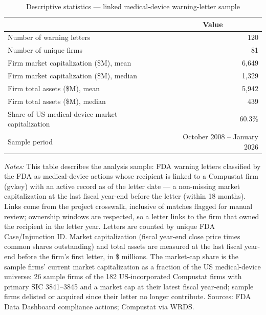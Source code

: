 \documentclass[11pt]{article}
\begin{document}
\begin{table}[h!]
\centering
\caption{Descriptive statistics --- linked medical-device warning-letter sample}
\begin{tabular}{lr}
\toprule
 & \multicolumn{1}{c}{Value} \\
\midrule
Number of warning letters & 120 \\
Number of unique firms & 81 \\
Firm market capitalization (\$M), mean & 6,649 \\
Firm market capitalization (\$M), median & 1,329 \\
Firm total assets (\$M), mean & 5,942 \\
Firm total assets (\$M), median & 439 \\
Share of US medical-device market capitalization & 60.3\% \\
Sample period & October 2008 -- January 2026 \\
\bottomrule
\end{tabular}

\vspace{1em}
\begin{minipage}{0.92\textwidth}
\footnotesize
\emph{Notes:} This table describes the analysis sample: FDA warning letters classified by the FDA as medical-device actions whose recipient is linked to a Compustat firm (gvkey) with an active record as of the letter date — a non-missing market capitalization at the last fiscal year-end before the letter (within 18 months). Links come from the project crosswalk, inclusive of matches flagged for manual review; ownership windows are respected, so a letter links to the firm that owned the recipient in the letter year. Letters are counted by unique FDA Case/Injunction ID. Market capitalization (fiscal year-end close price times common shares outstanding) and total assets are measured at the last fiscal year-end before the firm's first letter, in \$ millions. The market-cap share is the sample firms' current market capitalization as a fraction of the US medical-device universe: 26 sample firms of the 182 US-incorporated Compustat firms with primary SIC 3841--3845 and a market cap at their latest fiscal year-end; sample firms delisted or acquired since their letter no longer contribute. Sources: FDA Data Dashboard compliance actions; Compustat via WRDS.
\end{minipage}
\end{table}
\end{document}
